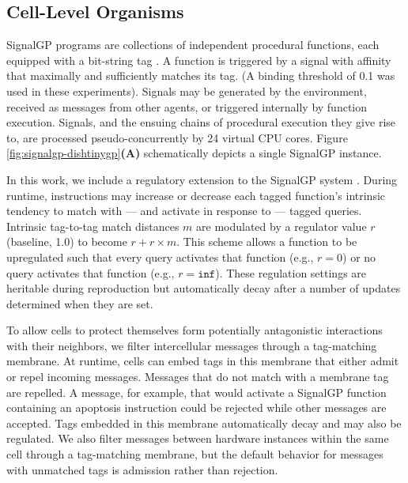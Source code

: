 \subsection{Cell-Level Organisms} \label{sup:cell_level_organisms}

SignalGP programs are collections of independent procedural functions, each equipped with a bit-string tag \cite{lalejini2018evolving}.
A function is triggered by a signal with affinity that maximally and sufficiently matches its tag.
(A binding threshold of 0.1 was used in these experiments).
Signals may be generated by the environment, received as messages from other agents, or triggered internally by function execution.
Signals, and the ensuing chains of procedural execution they give rise to, are processed pseudo-concurrently by 24 virtual CPU cores.
Figure \ref{fig:signalgp-dishtinygp}\textbf{(A)} schematically depicts a single SignalGP instance.

In this work, we include a regulatory extension to the SignalGP system \cite{lalejini2021tag}.
During runtime, instructions may increase or decrease each tagged function's intrinsic tendency to match with --- and activate in response to --- tagged queries.
Intrinsic tag-to-tag match distances $m$ are modulated by a regulator value $r$ (baseline, 1.0) to become $r + r \times m$.
This scheme allows a function to be upregulated such that every query activates that function (e.g., $r = 0$) or no query activates that function (e.g., $r = \texttt{inf}$).
These regulation settings are heritable during reproduction but automatically decay after a number of updates determined when they are set.

To allow cells to protect themselves form potentially antagonistic interactions with their neighbors, we filter intercellular messages through a tag-matching membrane.
At runtime, cells can embed tags in this membrane that either admit or repel incoming messages.
Messages that do not match with a membrane tag are repelled.
A message, for example, that would activate a SignalGP function containing an apoptosis instruction could be rejected while other messages are accepted.
Tags embedded in this membrane automatically decay and may also be regulated.
We also filter messages between hardware instances within the same cell through a tag-matching membrane, but the default behavior for messages with unmatched tags is admission rather than rejection.

